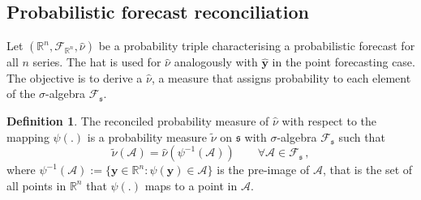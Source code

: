 \documentclass[12pt]{article}
\newtheorem{theo}{Theorem}[section]
\theoremstyle{definition}
\newtheorem{definition}{Definition}[section]
\begin{document}
%

\subsection{Probabilistic forecast reconciliation} \label{subsec:ProbForecastRecon}

Let $(\mathbb{R}^n, \mathscr{F}_{\mathbb{R}^n}, \hat{\nu})$ be a probability triple characterising a probabilistic forecast for all $n$ series. The hat is used for $\hat{\nu}$ analogously with $\hat{\bm y}$ in the point forecasting case.  The objective is to derive a $\hat{\nu}$, a measure that assigns probability to each element of the $\sigma$-algebra $\mathscr{F}_\mathfrak{s}$.
 
\begin{definition} \label{def:reconprob}
	The reconciled probability measure of $\hat{\nu}$ with respect to the mapping $\psi(.)$ is a probability measure $\tilde{\nu}$ on $\mathfrak{s}$ with $\sigma$-algebra $\mathscr{F}_\mathfrak{s}$ such that
	\[
	\tilde{\nu}(\mathcal{A}) =  \hat{\nu}(\psi^{-1}(\mathcal{A})) \qquad \forall \mathcal{A} \in \mathscr{F}_{\mathfrak{s}}\,,
	\]
	where $\psi^{-1}(\mathcal{A}):=\{{\bm{y}}\in \mathbb{R}^n:\psi({\bm{y}})\in \mathcal{A}\}$ is the pre-image of $\mathcal{A}$, that is the set of all points in $\mathbb{R}^n$ that $\psi(.)$ maps to a point in $\mathcal{A}$.
\end{definition}
\end{document}
